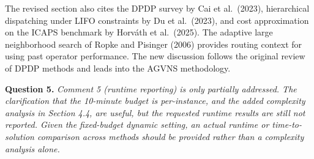 \documentclass[11pt]{article}
\newcommand{\question}[2]{\vspace{0.5em}\noindent\textbf{Question #1.} \emph{#2}\par}
\begin{document}
The revised section also cites the DPDP survey by Cai et al.\ (2023), hierarchical dispatching under LIFO constraints by Du et al.\ (2023), and cost approximation on the ICAPS benchmark by Horv\'ath et al.\ (2025). The adaptive large neighborhood search of Ropke and Pisinger (2006) provides routing context for using past operator performance. The new discussion follows the original review of DPDP methods and leads into the AGVNS methodology.

\question{5}{Comment 5 (runtime reporting) is only partially addressed. The clarification that the 10-minute budget is per-instance, and the added complexity analysis in Section 4.4, are useful, but the requested runtime results are still not reported. Given the fixed-budget dynamic setting, an actual runtime or time-to-solution comparison across methods should be provided rather than a complexity analysis alone.}

\end{document}

